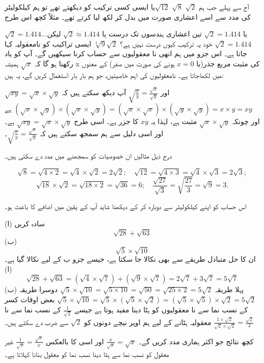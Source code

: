 آج سے پہلے جب ہم  \(\sqrt{2}\) \(\sqrt{8}\) \(\sqrt{12}\)یا ایسی کسی ترکیب کو دیکھتے تھے تو ہم کیلکولیٹر کی مدد سے اسے اعشاری صورت میں بدل کر لکھ لیا کرتے تھے۔ مثلاً کچھ اس طرح

\(\sqrt{2}=1.414\dotsc\)یا 
\(\sqrt{2}=1.414\) تین اعشاری ہندسوں تک درست یا
\(\sqrt{2}\approx 1.414\)
لیکن \(\sqrt{2}=1.414\) خود یہ ترکیب کیوں درست نہیں ہے؟
\(\sqrt{2}\)\(\sqrt[3]{9}\) ایسی تراکیب کو نامعقولیہ کہا جاتا ہے۔ اس جزو میں ہم انھی نا معقولیوں سے حساب کرنا سیکھیں گے۔
آپ کو یاد رکھنا ہو گا کہ \(\sqrt{x}\) ہمیشہ x کی مثبت مربع جذر(یا \(x=0\) ہونے کی صورت میں صفر) کے معنوں میں لکھاجاتا ہے۔
نامعقولیوں کی اہم خاصیتیں، جو ہم بار بار استعمال کریں گے، یہ ہیں:

\(\sqrt{xy}=\sqrt{x}\times\sqrt{y}\)
 اور 
\(\sqrt{\frac{x}{y}}=\frac{\sqrt{x}}{\sqrt{y}}\)
آپ دیکھ سکتے ہیں کہ \((\sqrt{x}\times\sqrt{y})\times(\sqrt{x}\times\sqrt{y})=(\sqrt{x}\times\sqrt{x})\times(\sqrt{y}\times\sqrt{y})=x\times y=xy\)  ہے اور چونکہ \(\sqrt{x}\times\sqrt{y}\) مثبت ہے، لہٰذا یہ \(xy\) کا جزر ہے۔ اسی طرح \(\sqrt{xy}=\sqrt{x}\times\sqrt{y}\) ہے۔ اور اسی دلیل سے ہم سمجھ سکتے ہیں کہ \(\sqrt{\frac{x}{y}}=\frac{\sqrt{x}}{\sqrt{y}}\)۔

درج ذیل مثالیں ان خصوصیات کو سمجھنے میں مدد دے سکتی ہیں۔

\[\sqrt{8}=\sqrt{4\times 2}=\sqrt{4}\times\sqrt{2}=2\sqrt{2};\quad\sqrt{12}=\sqrt{4\times 3}=\sqrt{4}\times\sqrt{3}=2\sqrt{3};\]
\[\sqrt{18}\times \sqrt{2}=\sqrt{18\times 2}=\sqrt{36}=6;\quad \frac{\sqrt{27}}{\sqrt{3}}=\sqrt{\frac{27}{3}}=\sqrt{9}=3.\]

اس حساب کو اپنے کیلکولیٹر سے دوبارہ کر کے دیکھنا شاید آپ کے یقین میں اضافے کا باعث ہو۔

سادہ کریں 
(ا)\[\sqrt{28}+\sqrt{63}\]
(ب) \[\sqrt{5}\times \sqrt{10}\]
ان کا حل متبادل طریقے سے بھی نکالا جا سکتا ہے، جیسے جزو ب کے لیے نکالا گیا ہے۔
(ا) \[\sqrt{28}+\sqrt{63}=(\sqrt{4}\times\sqrt{7})+(\sqrt{9}\times\sqrt{7})=2\sqrt{7}+3\sqrt{7}=5\sqrt{7}\]
(ب) پہلا طریقہ \(\sqrt{5}\times\sqrt{10}=\sqrt{5\times10}=\sqrt{50}=\sqrt{25\times 2}=5\sqrt{2}\)
دوسرا طریقہ \(\sqrt{5}\times\sqrt{10}=\sqrt{5}\times(\sqrt{5}\times\sqrt{2})=(\sqrt{5}\times\sqrt{5})\times\sqrt{2}=5\sqrt{2}\)
بعض اوقات کسر کے نسب نما سے نا معقولیوں کو ہٹا دینا مفید ہوتا ہے جیسے \(\frac{1}{\sqrt{2}}\) کے نسب نما سے نا معقولیہ ہٹانے کے لیے ہم اوپر نیچے دونوں کو \(\sqrt{2}\) سے ضرب دے سکتے ہیں۔ \(\frac{1\times\sqrt{2}}{\sqrt{2}\times\sqrt{2}}=\frac{\sqrt{2}}{2}\)

کچھ نتائج جو اکثر ہماری مدد کریں گے۔
\(\frac{x}{\sqrt{x}}=\sqrt{x}\) اور اسی کا بالعکس \(\frac{1}{\sqrt{x}}=\frac{\sqrt{x}}{x}\)
غیر معقول کو نسب نما سے ہٹا دینا نسب نما کو معقول بنانا کہلاتا ہے۔

